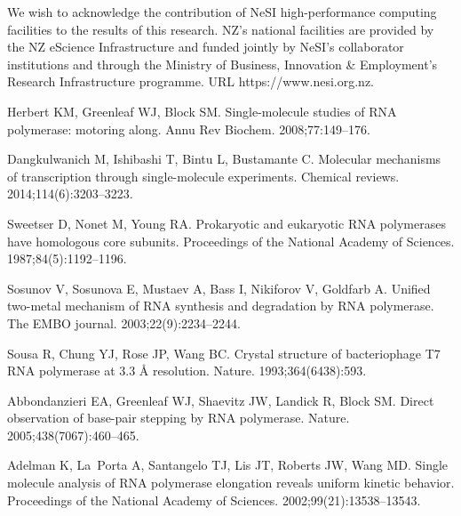 \documentclass[10pt,letterpaper]{article}
\begin{document}
{{We wish to acknowledge the contribution of NeSI high-performance computing facilities to the results of this research. NZ's national facilities are provided by the NZ eScience Infrastructure and funded jointly by NeSI's collaborator institutions and through the Ministry of Business, Innovation \& Employment's Research Infrastructure programme. URL https://www.nesi.org.nz.
\nolinenumbers

%
%
% 

%

\begin{thebibliography}{10}

Herbert KM, Greenleaf WJ, Block SM.
\newblock Single-molecule studies of RNA polymerase: motoring along.
\newblock Annu Rev Biochem. 2008;77:149--176.

Dangkulwanich M, Ishibashi T, Bintu L, Bustamante C.
\newblock Molecular mechanisms of transcription through single-molecule
  experiments.
\newblock Chemical reviews. 2014;114(6):3203--3223.

Sweetser D, Nonet M, Young RA.
\newblock Prokaryotic and eukaryotic RNA polymerases have homologous core
  subunits.
\newblock Proceedings of the National Academy of Sciences.
  1987;84(5):1192--1196.

Sosunov V, Sosunova E, Mustaev A, Bass I, Nikiforov V, Goldfarb A.
\newblock Unified two-metal mechanism of RNA synthesis and degradation by RNA
  polymerase.
\newblock The EMBO journal. 2003;22(9):2234--2244.

Sousa R, Chung YJ, Rose JP, Wang BC.
\newblock Crystal structure of bacteriophage T7 RNA polymerase at 3.3 {\AA}
  resolution.
\newblock Nature. 1993;364(6438):593.

Abbondanzieri EA, Greenleaf WJ, Shaevitz JW, Landick R, Block SM.
\newblock Direct observation of base-pair stepping by RNA polymerase.
\newblock Nature. 2005;438(7067):460--465.

Adelman K, La~Porta A, Santangelo TJ, Lis JT, Roberts JW, Wang MD.
\newblock Single molecule analysis of RNA polymerase elongation reveals uniform
  kinetic behavior.
\newblock Proceedings of the National Academy of Sciences.
  2002;99(21):13538--13543.


\end{thebibliography}}}
\end{document}
